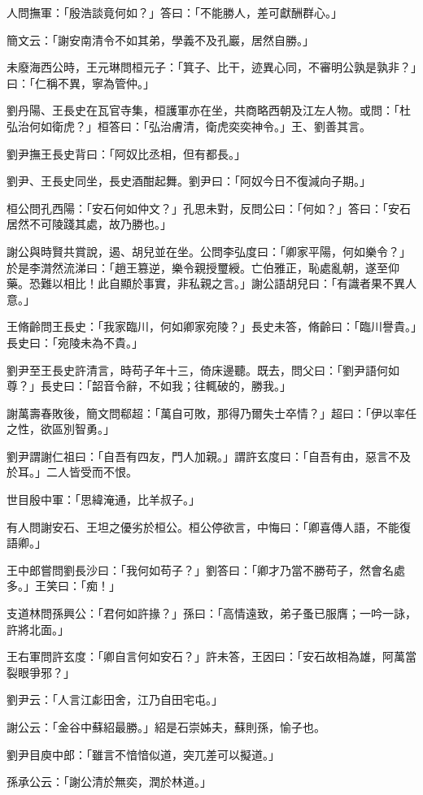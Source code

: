 人問撫軍：「殷浩談竟何如？」答曰：「不能勝人，差可獻酬群心。」

簡文云：「謝安南清令不如其弟，學義不及孔巖，居然自勝。」

未廢海西公時，王元琳問桓元子：「箕子、比干，迹異心同，不審明公孰是孰非？」曰：「仁稱不異，寧為管仲。」

劉丹陽、王長史在瓦官寺集，桓護軍亦在坐，共商略西朝及江左人物。或問：「杜弘治何如衛虎？」桓答曰：「弘治膚清，衛虎奕奕神令。」王、劉善其言。

劉尹撫王長史背曰：「阿奴比丞相，但有都長。」

劉尹、王長史同坐，長史酒酣起舞。劉尹曰：「阿奴今日不復減向子期。」

桓公問孔西陽：「安石何如仲文？」孔思未對，反問公曰：「何如？」答曰：「安石居然不可陵踐其處，故乃勝也。」

謝公與時賢共賞說，遏、胡兒並在坐。公問李弘度曰：「卿家平陽，何如樂令？」於是李潸然流涕曰：「趙王篡逆，樂令親授璽綬。亡伯雅正，恥處亂朝，遂至仰藥。恐難以相比！此自顯於事實，非私親之言。」謝公語胡兒曰：「有識者果不異人意。」

王脩齡問王長史：「我家臨川，何如卿家宛陵？」長史未答，脩齡曰：「臨川譽貴。」長史曰：「宛陵未為不貴。」

劉尹至王長史許清言，時苟子年十三，倚床邊聽。既去，問父曰：「劉尹語何如尊？」長史曰：「韶音令辭，不如我；往輒破的，勝我。」

謝萬壽春敗後，簡文問郗超：「萬自可敗，那得乃爾失士卒情？」超曰：「伊以率任之性，欲區別智勇。」

劉尹謂謝仁祖曰：「自吾有四友，門人加親。」謂許玄度曰：「自吾有由，惡言不及於耳。」二人皆受而不恨。

世目殷中軍：「思緯淹通，比羊叔子。」

有人問謝安石、王坦之優劣於桓公。桓公停欲言，中悔曰：「卿喜傳人語，不能復語卿。」

王中郎嘗問劉長沙曰：「我何如苟子？」劉答曰：「卿才乃當不勝苟子，然會名處多。」王笑曰：「痴！」

支道林問孫興公：「君何如許掾？」孫曰：「高情遠致，弟子蚤已服膺；一吟一詠，許將北面。」

王右軍問許玄度：「卿自言何如安石？」許未答，王因曰：「安石故相為雄，阿萬當裂眼爭邪？」

劉尹云：「人言江虨田舍，江乃自田宅屯。」

謝公云：「金谷中蘇紹最勝。」紹是石崇姊夫，蘇則孫，愉子也。

劉尹目庾中郎：「雖言不愔愔似道，突兀差可以擬道。」

孫承公云：「謝公清於無奕，潤於林道。」


